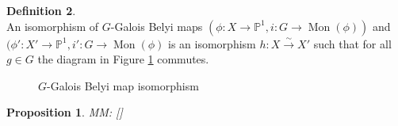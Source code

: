 \documentclass{dcthesis}
\newcommand{\PP}{\mathbb P}
\newcommand{\defi}[1]{\textsf{#1}}
\newcommand{\mm}[1]{{\color{blue} \sf MM: [#1]}}
\DeclareMathOperator{\Mon}{Mon}
\newtheorem{prop}{Proposition}[section]
\theoremstyle{definition}
\newtheorem{definition}[prop]{Definition}
\theoremstyle{remark}
\numberwithin{equation}{section}
\numberwithin{figure}{section}
\begin{document}
{{\begin{definition}
\[      \]
      An \defi{isomorphism of $G$-Galois Belyi maps}
      $(\phi\colon X\to\PP^1, i\colon G\to\Mon(\phi))$
      and
      $(\phi'\colon X'\to\PP^1, i'\colon G\to\Mon(\phi)$
      is an isomorphism $h\colon X\stackrel{\sim}{\to} X'$ such that
      for all $g\in G$
      the diagram in
      Figure \ref{fig:Gbelyiiso} commutes.
      \begin{figure}[ht]
        \begin{center}
        \end{center}
        \caption{$G$-Galois Belyi map isomorphism}
        \label{fig:Gbelyiiso}
      \end{figure}
      \begin{prop}\label{prop:Gauts}
        \mm{\cite[Prop. 3.6 ish]{triangles}}
      \end{prop}
    \end{definition}
  }
}
\end{document}
